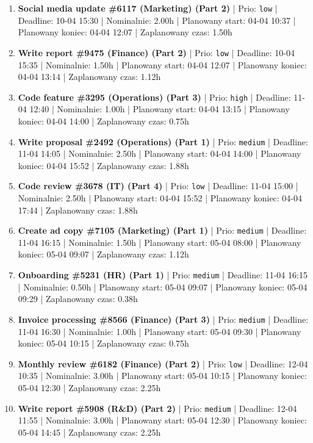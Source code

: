 {\begin{enumerate}
  \item [\textbf{14700}] \textbf{Social media update \#6117 (Marketing) (Part 2)} | Prio: \texttt{low} | Deadline: 10-04 15:30 | Nominalnie: 2.00h | Planowany start: 04-04 10:37 | Planowany koniec: 04-04 12:07 | Zaplanowany czas: 1.50h
  \item [\textbf{14685}] \textbf{Write report \#9475 (Finance) (Part 2)} | Prio: \texttt{low} | Deadline: 10-04 15:35 | Nominalnie: 1.50h | Planowany start: 04-04 12:07 | Planowany koniec: 04-04 13:14 | Zaplanowany czas: 1.12h
  \item [\textbf{14608}] \textbf{Code feature \#3295 (Operations) (Part 3)} | Prio: \texttt{high} | Deadline: 11-04 12:40 | Nominalnie: 1.00h | Planowany start: 04-04 13:15 | Planowany koniec: 04-04 14:00 | Zaplanowany czas: 0.75h
  \item [\textbf{14668}] \textbf{Write proposal \#2492 (Operations) (Part 1)} | Prio: \texttt{medium} | Deadline: 11-04 14:05 | Nominalnie: 2.50h | Planowany start: 04-04 14:00 | Planowany koniec: 04-04 15:52 | Zaplanowany czas: 1.88h
  \item [\textbf{14699}] \textbf{Code review \#3678 (IT) (Part 4)} | Prio: \texttt{low} | Deadline: 11-04 15:00 | Nominalnie: 2.50h | Planowany start: 04-04 15:52 | Planowany koniec: 04-04 17:44 | Zaplanowany czas: 1.88h
  \item [\textbf{14650}] \textbf{Create ad copy \#7105 (Marketing) (Part 1)} | Prio: \texttt{medium} | Deadline: 11-04 16:15 | Nominalnie: 1.50h | Planowany start: 05-04 08:00 | Planowany koniec: 05-04 09:07 | Zaplanowany czas: 1.12h
  \item [\textbf{14671}] \textbf{Onboarding \#5231 (HR) (Part 1)} | Prio: \texttt{medium} | Deadline: 11-04 16:15 | Nominalnie: 0.50h | Planowany start: 05-04 09:07 | Planowany koniec: 05-04 09:29 | Zaplanowany czas: 0.38h
  \item [\textbf{14675}] \textbf{Invoice processing \#8566 (Finance) (Part 3)} | Prio: \texttt{medium} | Deadline: 11-04 16:30 | Nominalnie: 1.00h | Planowany start: 05-04 09:30 | Planowany koniec: 05-04 10:15 | Zaplanowany czas: 0.75h
  \item [\textbf{14690}] \textbf{Monthly review \#6182 (Finance) (Part 2)} | Prio: \texttt{low} | Deadline: 12-04 10:35 | Nominalnie: 3.00h | Planowany start: 05-04 10:15 | Planowany koniec: 05-04 12:30 | Zaplanowany czas: 2.25h
  \item [\textbf{14674}] \textbf{Write report \#5908 (R\&D) (Part 2)} | Prio: \texttt{medium} | Deadline: 12-04 11:55 | Nominalnie: 3.00h | Planowany start: 05-04 12:30 | Planowany koniec: 05-04 14:45 | Zaplanowany czas: 2.25h

\end{enumerate}}
